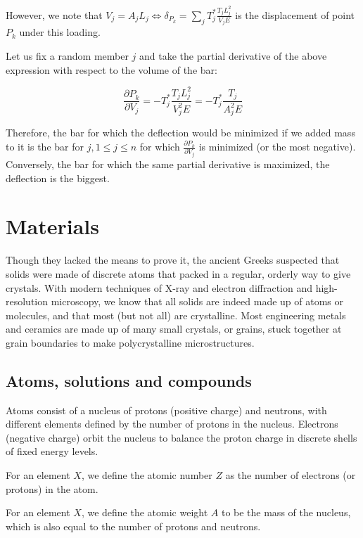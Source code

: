 \documentclass{article}
\begin{document}
However, we note that $V_j = A_jL_j \iff \delta_{P_k} = \sum_j T_j^* \frac{T_jL_j^2}{V_jE}$ is the displacement of point $P_k$ under this loading.

Let us fix a random member $j$ and take the partial derivative of the above expression with respect to the volume of the bar:

\[ \frac{\partial P_k}{\partial V_j} = -T_j^* \frac{T_jL_j^2}{V_j^2E} = -T_j^* \frac{T_j}{A_j^2E}  \]

Therefore, the bar for which the deflection would be minimized if we added mass to it is the bar for $j, 1 \leq j \leq n$ for which $\frac{\partial P_k}{\partial V_j}$ is minimized (or the most negative). Conversely, the bar for which the same partial derivative is maximized, the deflection is the biggest.

\newpage

\section{Materials}

Though they lacked the means to prove it, the ancient Greeks suspected that solids were made of discrete
atoms that packed in a regular, orderly way to give crystals. With modern techniques of X-ray and
electron diffraction and high-resolution microscopy, we know that all solids are indeed made up of
atoms or molecules, and that most (but not all) are crystalline. Most engineering metals and
ceramics are made up of many small crystals, or grains, stuck together at grain boundaries to make
polycrystalline microstructures.

\subsection{Atoms, solutions and compounds}

Atoms consist of a nucleus of protons (positive charge) and neutrons, with different elements defined by the number of protons in the nucleus. Electrons (negative charge) orbit the nucleus to balance the proton charge in discrete shells of fixed energy levels. 

\begin{definition}
    For an element $X$, we define the atomic number $Z$ as the number of electrons (or protons) in the atom.
\end{definition}

\begin{definition}
    For an element $X$, we define the atomic weight $A$ to be the mass of the nucleus, which is also equal to the number of protons and neutrons.
\end{definition}
\end{document}
